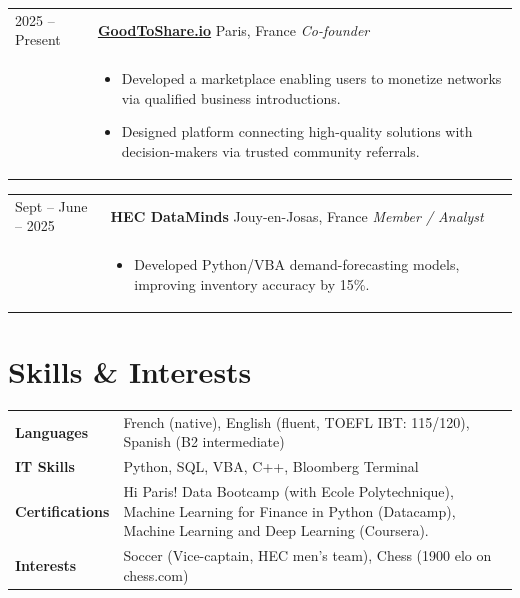 \documentclass[11pt,a4paper]{article}
\makeatletter
\newlength{\datecolwidth}
\newcommand{\CVItem}[5]{%
    \noindent%
    \begin{tabularx}{\textwidth}{@{}p{\datecolwidth} X@{}}
        #1 & \textbf{#2} \hfill #3 \newline \textit{#4} \\ %
           & #5 
    \end{tabularx}%
    \vspace{2pt}%
}
\makeatother
\begin{document}
\CVItem{2025 -- Present}
    {\href{https://goodtoshare.io}{GoodToShare.io}}
    {Paris, France}
    {Co-founder}
    {\begin{itemize}
        \item Developed a marketplace enabling users to monetize networks via qualified business introductions.
        \item Designed platform connecting high-quality solutions with decision-makers via trusted community referrals.
    \end{itemize}}

\CVItem{Sept -- June \newline 2023 -- 2025}
    {HEC DataMinds}
    {Jouy-en-Josas, France}
    {Member / Analyst}
    {\begin{itemize}
        \item Developed Python/VBA demand-forecasting models, improving inventory accuracy by 15\%.
    \end{itemize}}

\section{Skills \& Interests}

\noindent
\begin{tabularx}{\textwidth}{@{}p{\datecolwidth} X@{}}
    \textbf{Languages} & French (native), English (fluent, TOEFL IBT: 115/120), Spanish (B2 intermediate) \\
    \textbf{IT Skills} & Python, SQL, VBA, C++, Bloomberg Terminal \\
    \textbf{Certifications} & Hi Paris! Data Bootcamp (with Ecole Polytechnique), Machine Learning for Finance in Python (Datacamp), Machine Learning and Deep Learning (Coursera). \\
    \textbf{Interests} & Soccer (Vice-captain, HEC men’s team), Chess (1900 elo on chess.com)
\end{tabularx}
\end{document}
